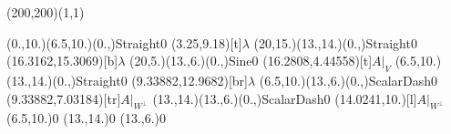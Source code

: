 \unitlength=1bp%

\begin{feynartspicture}(200,200)(1,1)

\FADiagram{}
\FAProp(0.,10.)(6.5,10.)(0.,){Straight}{0}
\FALabel(3.25,9.18)[t]{$\lambda$}
\FAProp(20,15.)(13.,14.)(0.,){Straight}{0}
\FALabel(16.3162,15.3069)[b]{$\lambda$}
\FAProp(20,5.)(13.,6.)(0.,){Sine}{0}
\FALabel(16.2808,4.44558)[t]{$A|_V$}
\FAProp(6.5,10.)(13.,14.)(0.,){Straight}{0}
\FALabel(9.33882,12.9682)[br]{$\lambda$}
\FAProp(6.5,10.)(13.,6.)(0.,){ScalarDash}{0}
\FALabel(9.33882,7.03184)[tr]{$A|_{W^\perp}$}
\FAProp(13.,14.)(13.,6.)(0.,){ScalarDash}{0}
\FALabel(14.0241,10.)[l]{$A|_{W^\perp}$}
\FAVert(6.5,10.){0}
\FAVert(13.,14.){0}
\FAVert(13.,6.){0}
\end{feynartspicture}

